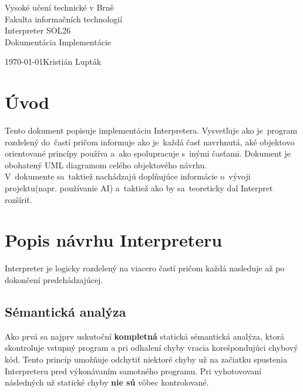 \documentclass[a4paper, 11pt]{article}
\begin{document}
    \begin{titlepage}
        \begin{center}
            {\Huge Vysoké učení technické v Brně} \\ 
            {\huge Fakulta informačních technologií}  \\
            
            {\Huge Interpreter SOL26}\\ 
            {\large Dokumentácia Implementácie}

        \end{center}

        {\Large \today \hfill Kristián Lupták}
    \end{titlepage}

    \tableofcontents
    \newpage
    

    \section{Úvod}
        Tento dokument popisuje implementáciu Interpretera. 
        Vysvetľuje ako je~program rozdelený do~častí pričom informuje ako je~každá časť navrhnutá, aké objektovo orientované princípy používa a~ako spolupracuje s~inými časťami.
        Dokument je obohatený UML diagramom celého objektového návrhu. \\

        \noindent
        V~dokumente sa~taktiež nachádzajú doplňujúce informácie o~vývoji projektu(napr. používanie AI) a~taktiež ako by sa~teoreticky dal Interpret rozšíriť.
        \medskip
    \section{Popis návrhu Interpreteru}
        Interpreter je logicky rozdelený na viacero častí pričom každá nasleduje až po dokončení predchádzajúcej.

        \subsection{Sémantická analýza}
        Ako prvá sa najprv uskutoční \textbf{kompletná} statická sémantická analýza, ktorá skontroluje vstupný program a pri odhalení chyby vracia korešpondujúci chybový kód. 
        Tento princíp umožňuje odchytiť niektoré chyby už na začiatku spustenia Interpreteru pred výkonávaním samotného programu.
        Pri vyhotovovaní následných už statické chyby \textbf{nie sú} vôbec kontrolované. \\
\end{document}
